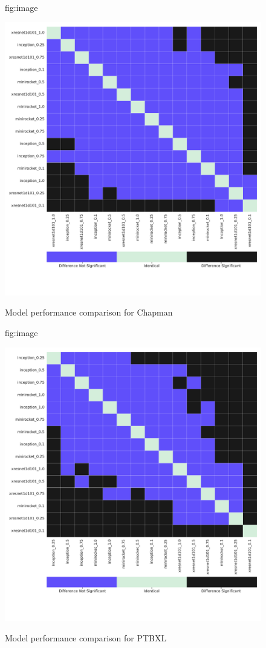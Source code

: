 \documentclass[pmlr,twocolumn]{jmlr}%
\begin{document}
\begin{figure}[tbp]
\floatconts
  {fig:image}
  {\caption{Model performance comparison for Chapman}}
  {\includegraphics[width=1\linewidth]{images/model_comparisons_ChapmanShaoxing.pdf}}
 
\end{figure}

\begin{figure}[tbp]
\floatconts
  {fig:image}
  {\caption{Model performance comparison for PTBXL}}
  {\includegraphics[width=1\linewidth]{images/model_comparisons_PTBXL.pdf}}
 
\end{figure}
\end{document}
